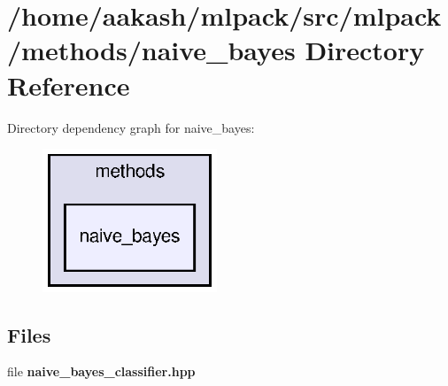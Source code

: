 \section{/home/aakash/mlpack/src/mlpack/methods/naive\+\_\+bayes Directory Reference}
\label{dir_0c9cebbae2836f20c48fc7820984e89e}
Directory dependency graph for naive\+\_\+bayes\+:
\nopagebreak
\begin{figure}[H]
\begin{center}
\leavevmode
\includegraphics[width=148pt]{dir_0c9cebbae2836f20c48fc7820984e89e_dep}
\end{center}
\end{figure}
\subsection*{Files}
\begin{DoxyCompactItemize}
\item 
file \textbf{ naive\+\_\+bayes\+\_\+classifier.\+hpp}
\end{DoxyCompactItemize}
